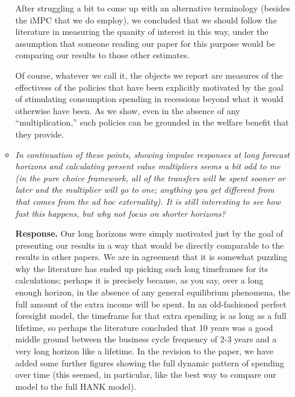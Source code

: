 \documentclass[12pt,letterpaper,english]{article}
\begin{document}
\begin{enumerate}
\begin{itemize}
          After struggling a bit to come up with an alternative terminology (besides the iMPC that we do employ), we concluded that we should follow the literature in measuring the quanity of interest in this way, under the assumption that someone reading our paper for this purpose would be comparing our results to those other estimates.  %

          Of course, whatever we call it, the objects we report are measures of the effectivess of the policies that have been explicitly motivated by the goal of stimulating consumption spending in recessions beyond what it would otherwise have been. As we show, even in the absence of any ``multiplication,'' such policies can be grounded in the welfare benefit that they provide.

	
	\item \textit{In continuation of these points, showing impulse responses at long forecast horizons and calculating present value multipliers seems a bit odd to me (in	the pure choice framework, all of the transfers will be spent sooner or later and	the multiplier will go to one; anything you get different from that comes from the ad hoc externality). It is still interesting to see how fast this happens, but why not focus on shorter horizons?}
	
          \noindent \textbf{Response.} Our long horizons were simply motivated just by the goal of presenting our results in a way that would be directly comparable to the results in other papers.  We are in agreement that it is somewhat puzzling why the literature has ended up picking such long timeframes for its calculations; perhaps it is precisely because, as you say, over a long enough horizon, in the absence of any general equilibrium phenomena, the full amount of the extra income will be spent. In an old-fashioned perfect foresight model, the timeframe for that extra spending is as long as a full lifetime, so perhaps the literature concluded that 10 years was a good middle ground between the business cycle frequency of 2-3 years and a very long horizon like a lifetime.
          In the revision to the paper, we have added some further figures showing the full dynamic pattern of spending over time (this seemed, in particular, like the best way to compare our model to the full HANK model).
	

\end{itemize}
\end{enumerate}
\end{document}
